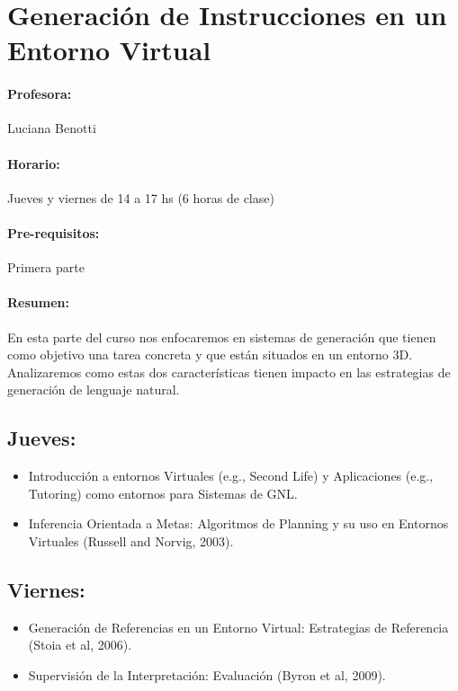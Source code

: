 \documentclass[a4paper]{article}
\begin{document}
\section{Generaci\'on de Instrucciones en un Entorno Virtual}

\paragraph{Profesora:} Luciana Benotti 

\paragraph{Horario:} Jueves y viernes de 14 a 17 hs (6 horas de clase)

\paragraph{Pre-requisitos:} Primera parte

\paragraph{Resumen:} En esta parte del curso nos enfocaremos en sistemas de generaci\'on que tienen como objetivo una tarea concreta y que est\'an situados en un entorno 3D. Analizaremos como estas dos caracter\'isticas tienen impacto en las estrategias de generaci\'on de lenguaje natural.

\subsection*{Jueves:} 

\begin{itemize}
\item Introducci\'on a entornos Virtuales (e.g., Second Life) y Aplicaciones (e.g., Tutoring) como entornos para Sistemas de GNL. 
\item Inferencia Orientada a Metas: Algoritmos de Planning y su uso en Entornos Virtuales (Russell and Norvig, 2003). 
\end{itemize}

\subsection*{Viernes:} 
\begin{itemize}
\item Generaci\'on de Referencias en un Entorno Virtual: Estrategias de Referencia (Stoia et al, 2006).
\item Supervisi\'on de la Interpretaci\'on: Evaluaci\'on (Byron et al, 2009).  
\end{itemize}
\end{document}
